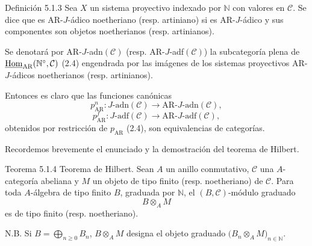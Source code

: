 \begin{statement}{Definición 5.1.3}
Sea \(X\) un sistema proyectivo indexado por \(\mathbb N\) con valores en \(\mathcal C\). Se dice que es AR-\(J\)-ádico noetheriano (resp. artiniano) si es AR-\(J\)-ádico y sus componentes son objetos noetherianos (resp. artinianos).
\end{statement}

Se denotará por AR-\(J\)-adn\((\mathcal C)\) (resp. AR-\(J\)-adf\((\mathcal C)\)) la subcategoría plena de \(\underline{\operatorname{Hom}}_{\mathrm{AR}}(\mathbb N^\circ,\mathcal C)\) (2.4) engendrada por las imágenes de los sistemas proyectivos AR-\(J\)-ádicos noetherianos (resp. artinianos).

Entonces es claro que las funciones canónicas
\[
p^n_{\mathrm{AR}}:J\text{-adn}(\mathcal C)\longrightarrow \mathrm{AR}\text{-}J\text{-adn}(\mathcal C),
\]
\[
p^f_{\mathrm{AR}}:J\text{-adf}(\mathcal C)\longrightarrow \mathrm{AR}\text{-}J\text{-adf}(\mathcal C),
\]
obtenidos por restricción de \(p_{\mathrm{AR}}\) (2.4), son equivalencias de categorías.

Recordemos brevemente el enunciado y la demostración del teorema de Hilbert.

\begin{statement}{Teorema 5.1.4}
Teorema de Hilbert. Sean \(A\) un anillo conmutativo, \(\mathcal C\) una \(A\)-categoría abeliana y \(M\) un objeto de tipo finito (resp. noetheriano) de \(\mathcal C\). Para toda \(A\)-álgebra de tipo finito \(B\), graduada por \(\mathbb N\), el \((B,\mathcal C)\)-módulo graduado
\[
B\otimes_A M
\]
es de tipo finito (resp. noetheriano).

N.B. Si \(B=\bigoplus_{n\ge0}B_n\), \(B\otimes_A M\) designa el objeto graduado \(\bigl(B_n\otimes_A M\bigr)_{n\in\mathbb N}\).
\end{statement}
